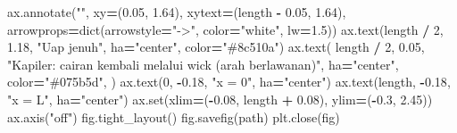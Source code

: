 \documentclass[
  12pt,a4paper,oneside]{report}
\newenvironment{Shaded}{\begin{snugshade}}{\end{snugshade}}
\newcommand{\BuiltInTok}[1]{#1}
\newcommand{\DecValTok}[1]{\textcolor[rgb]{0.00,0.00,0.81}{#1}}
\newcommand{\FloatTok}[1]{\textcolor[rgb]{0.00,0.00,0.81}{#1}}
\newcommand{\NormalTok}[1]{#1}
\newcommand{\OperatorTok}[1]{\textcolor[rgb]{0.81,0.36,0.00}{\textbf{#1}}}
\newcommand{\StringTok}[1]{\textcolor[rgb]{0.31,0.60,0.02}{#1}}
\begin{document}
\begin{Shaded}
\begin{Highlighting}[]
\NormalTok{    ax.annotate(}\StringTok{""}\NormalTok{, xy}\OperatorTok{=}\NormalTok{(}\FloatTok{0.05}\NormalTok{, }\FloatTok{1.64}\NormalTok{), xytext}\OperatorTok{=}\NormalTok{(length }\OperatorTok{{-}} \FloatTok{0.05}\NormalTok{, }\FloatTok{1.64}\NormalTok{),}
\NormalTok{                arrowprops}\OperatorTok{=}\BuiltInTok{dict}\NormalTok{(arrowstyle}\OperatorTok{=}\StringTok{"{-}\textgreater{}"}\NormalTok{, color}\OperatorTok{=}\StringTok{"white"}\NormalTok{, lw}\OperatorTok{=}\FloatTok{1.5}\NormalTok{))}
\NormalTok{    ax.text(length }\OperatorTok{/} \DecValTok{2}\NormalTok{, }\FloatTok{1.18}\NormalTok{, }\StringTok{"Uap jenuh"}\NormalTok{, ha}\OperatorTok{=}\StringTok{"center"}\NormalTok{, color}\OperatorTok{=}\StringTok{"\#8c510a"}\NormalTok{)}
\NormalTok{    ax.text(}
\NormalTok{        length }\OperatorTok{/} \DecValTok{2}\NormalTok{, }\FloatTok{0.05}\NormalTok{,}
        \StringTok{"Kapiler: cairan kembali melalui wick (arah berlawanan)"}\NormalTok{,}
\NormalTok{        ha}\OperatorTok{=}\StringTok{"center"}\NormalTok{, color}\OperatorTok{=}\StringTok{"\#075b5d"}\NormalTok{,}
\NormalTok{    )}
\NormalTok{    ax.text(}\DecValTok{0}\NormalTok{, }\OperatorTok{{-}}\FloatTok{0.18}\NormalTok{, }\StringTok{"x = 0"}\NormalTok{, ha}\OperatorTok{=}\StringTok{"center"}\NormalTok{)}
\NormalTok{    ax.text(length, }\OperatorTok{{-}}\FloatTok{0.18}\NormalTok{, }\StringTok{"x = L"}\NormalTok{, ha}\OperatorTok{=}\StringTok{"center"}\NormalTok{)}
\NormalTok{    ax.}\BuiltInTok{set}\NormalTok{(xlim}\OperatorTok{=}\NormalTok{(}\OperatorTok{{-}}\FloatTok{0.08}\NormalTok{, length }\OperatorTok{+} \FloatTok{0.08}\NormalTok{), ylim}\OperatorTok{=}\NormalTok{(}\OperatorTok{{-}}\FloatTok{0.3}\NormalTok{, }\FloatTok{2.45}\NormalTok{))}
\NormalTok{    ax.axis(}\StringTok{"off"}\NormalTok{)}
\NormalTok{    fig.tight\_layout()}
\NormalTok{    fig.savefig(path)}
\NormalTok{    plt.close(fig)}



\end{Highlighting}
\end{Shaded}
\end{document}
